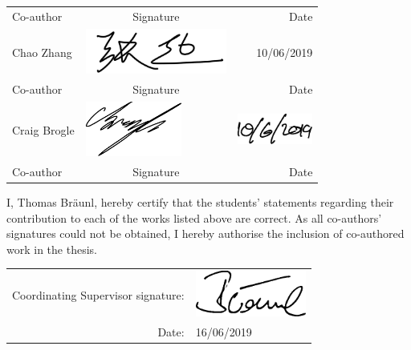 \begin{table}[ht]
\begin{tabular}{p{}p{}p{}}
		Co-author                   & \multicolumn{1}{c}{Signature} & \multicolumn{1}{r}{Date} \\[0.5cm]
		Chao Zhang                  & \centering\includegraphics[height=1.5cm]{Declaration/Img/chao.jpg}                    & \multicolumn{1}{r}{10/06/2019}     \\ \midrule
		Co-author                   & \multicolumn{1}{c}{Signature} & \multicolumn{1}{r}{Date} \\[0.2cm]
		Craig Brogle                & \centering\includegraphics[height=1.8cm]{Declaration/Img/craig}                    & \multicolumn{1}{r}{\hspace{-5cm}\includegraphics[height=1cm]{Declaration/Img/craigd}}     \\ \midrule
		Co-author                   & \multicolumn{1}{c}{Signature} & \multicolumn{1}{r}{Date} \\
	\end{tabular}
\end{table}

\begin{samepage}
	\noindent I, Thomas Bräunl, hereby certify that the students' statements regarding their contribution to each of the works listed above are correct. As all co-authors' signatures could not be obtained, I hereby authorise the inclusion of co-authored work in the thesis.
	
	\vspace{1ex}
	
	\begin{table}[h]
		\flushleft
		\begin{tabular}{rl}
			Coordinating Supervisor signature: & \includegraphics[height=1.5cm]{Declaration/Img/tb.png} \\
			Date: & 16/06/2019\\
		\end{tabular}
	\end{table}
\end{samepage}